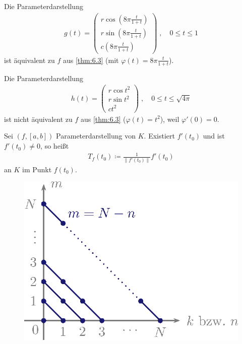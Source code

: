 \documentclass[a4paper,10pt]{scrbook}
\begin{document}
\begin{example}
  \begin{enum-arab}
    \item Die Parameterdarstellung
    \begin{align*}
      g(t) = \begin{pmatrix} r \cos \left( 8 \pi \frac{t}{1 + t} \right) \\ r \sin \left( 8 \pi \frac{t}{1 + t} \right) \\ c \left( 8 \pi \frac{t}{1 + t} \right) \end{pmatrix} \; , \quad 0 \leq t \leq 1
    \end{align*}
    ist äquivalent zu $f$ aus \ref{thm:6.3} (mit $\varphi(t) = 8 \pi \frac{t}{1 + t}$).

    \item Die Parameterdarstellung
    \begin{align*}
      h(t) = \begin{pmatrix} r \cos t^2 \\ r \sin t^2 \\ c t^2 \end{pmatrix} \; , \quad 0 \leq t \leq \sqrt{4 \pi}
    \end{align*}
    ist nicht äquivalent zu $f$ aus \ref{thm:6.3} ($\varphi(t) = t^2$), weil $\varphi'(0) = 0$.
  \end{enum-arab}
\end{example}

\begin{theorem}[Definition]
  Sei $(f,[a,b])$ Parameterdarstellung von $K$. Existiert $f'(t_0)$ und ist $f'(t_0) \neq 0$, so heißt
  \begin{align*}
    T_f(t_0) \coloneq \frac{1}{\|f'(t_0)\|} f'(t_0)
  \end{align*}
   an $K$ im Punkt $f(t_0)$.
  \begin{figure}[H]
    \centering
    \includegraphics[scale=0.2]{images/ana3-tmp-52}
  \end{figure}
\end{theorem}
\end{document}
